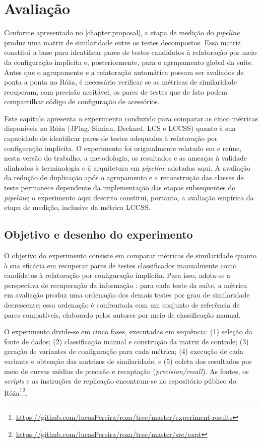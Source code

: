 \chapter{Avaliação}
\label{chapter:evaluation}

Conforme apresentado no \autoref{chapter:proposal}, a etapa de medição do \textit{pipeline} produz uma matriz de similaridade entre os testes decompostos. Essa matriz constitui a base para identificar pares de testes candidatos à refatoração por meio da configuração implícita e, posteriormente, para o agrupamento global da suíte. Antes que o agrupamento e a refatoração automática possam ser avaliados de ponta a ponta no Róża, é necessário verificar se as métricas de similaridade recuperam, com precisão aceitável, os pares de testes que de fato podem compartilhar código de configuração de acessórios.

Este capítulo apresenta o experimento conduzido para comparar as cinco métricas disponíveis no Róża (JPlag, Simian, Deckard, LCS e LCCSS) quanto à sua capacidade de identificar pares de testes adequados à refatoração por configuração implícita. O experimento foi originalmente relatado em  e reúne, nesta versão do trabalho, a metodologia, os resultados e as ameaças à validade alinhados à terminologia e à arquitetura em \textit{pipeline} adotadas aqui. A avaliação da redução de duplicação após o agrupamento e a reconstrução das classes de teste permanece dependente da implementação das etapas subsequentes do \textit{pipeline}; o experimento aqui descrito constitui, portanto, a avaliação empírica da etapa de medição, inclusive da métrica LCCSS.

\section{Objetivo e desenho do experimento}

O objetivo do experimento consiste em comparar métricas de similaridade quanto à sua eficácia em recuperar pares de testes classificados manualmente como candidatos à refatoração por configuração implícita. Para isso, adota-se a perspectiva de recuperação da informação \cite{baezayates:etal:1999}: para cada teste da suíte, a métrica em avaliação produz uma ordenação dos demais testes por grau de similaridade decrescente; essa ordenação é confrontada com um conjunto de referência de pares compatíveis, elaborado pelos autores por meio de classificação manual.

O experimento divide-se em cinco fases, executadas em sequência: (1) seleção da fonte de dados; (2) classificação manual e construção da matriz de controle; (3) geração de variantes de configuração para cada métrica; (4) execução de cada variante e obtenção das matrizes de similaridade; e (5) coleta dos resultados por meio de curvas médias de precisão e recaptação (\textit{precision/recall}). As fontes, os \textit{scripts} e as instruções de replicação encontram-se no repositório público do Róża\footnote{\url{https://github.com/lucasPereira/roza/tree/master/experiment-results}}\footnote{\url{https://github.com/lucasPereira/roza/tree/master/src/expt}}.

